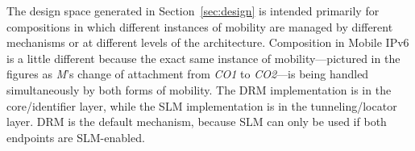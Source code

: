 The design space generated in
Section~\ref{sec:design} is intended primarily for compositions
in which different instances of mobility are managed by different
mechanisms or at different levels of the architecture.
Composition in Mobile IPv6 is a little different because the exact same
instance of mobility---pictured in the figures as {\it M}'s change
of attachment from {\it CO1} to {\it CO2}---is being handled simultaneously
by both forms of mobility.
The DRM implementation is in the core/identifier layer, while the SLM
implementation is in the tunneling/locator layer.
DRM is the default mechanism, because SLM can only be used if both
endpoints are SLM-enabled.
